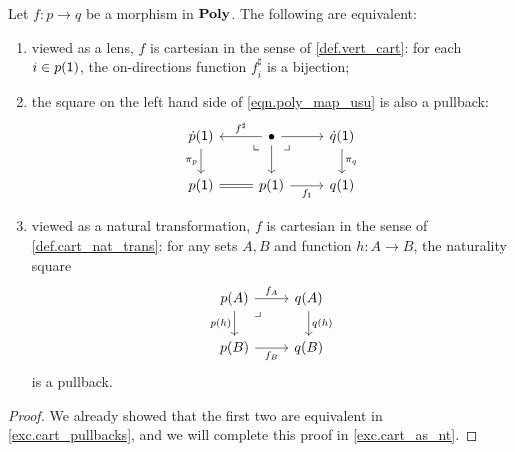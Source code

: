 \documentclass[Book-Poly]{subfiles}
\begin{document}
\begin{proposition}\label{prop.cart_as_nt}
Let $f\colon p\to q$ be a morphism in $\mathbf{Poly}$. The following are equivalent:
	\begin{enumerate}
		\item viewed as a lens, $f$ is cartesian in the sense of \cref{def.vert_cart}: for each $i\in p(\textsf{1})$, the on-directions function $f^\sharp_i$ is a bijection;
		\item the square on the left hand side of \eqref{eqn.poly_map_usu} is also a pullback:
\[
\begin{tikzcd}
	\dot{p}(\1)\ar[d, "\pi_p"']&
	\bullet\ar[l, "f^\sharp"']\ar[r]\ar[d]&
	\dot{q}(\1)\ar[d, "\pi_q"]\\
	p(\1)\ar[r, equal]\ar[ur, phantom, very near end, "\llcorner"]&
	p(\1)\ar[r, "f_\1"']&
	q(\1)\ar[ul, phantom, very near end, "\lrcorner"]
\end{tikzcd}
\]		
		\item viewed as a natural transformation, $f$ is cartesian in the sense of \cref{def.cart_nat_trans}: for any sets $A,B$ and function $h\colon A\to B$, the naturality square
\begin{equation} \label{eqn.cart_nt_pullback}
\begin{tikzcd}
	p(A)\ar[r, "f_A"]\ar[d, "p(h)"']&
	q(A)\ar[d, "q(h)"]\\
	p(B)\ar[r, "f_B"']&
	q(B)\ar[ul, phantom, very near end, "\lrcorner"]
\end{tikzcd}
\end{equation}
is a pullback.
  \end{enumerate}
\end{proposition}
\begin{proof}
We already showed that the first two are equivalent in \cref{exc.cart_pullbacks}, and we will complete this proof in \cref{exc.cart_as_nt}.
\end{proof}
\end{document}
